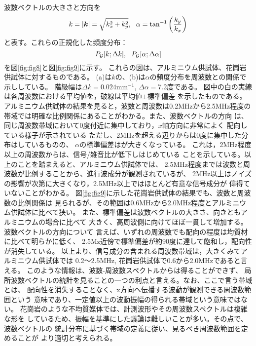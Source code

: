 波数ベクトルの大きさと方向を
\begin{equation}
	k=\left| \fat{k} \right|=\sqrt{k_x^2+k_y^2},  \ \ 
	\alpha = \tan^{-1} \left( \frac{k_y}{k_x} \right)
	\label{eqn:kpol}
\end{equation}
と表す。これらの正規化した頻度分布：
\[
	P_{\cal G}[k;\Delta k], \ \ 
	P_{\cal G}[\alpha;\Delta \alpha]
\]
を図\ref{fig:fig8}と図\ref{fig:fig9}に示す。
これらの図は、アルミニウム供試体、花崗岩供試体に対するものである。
(a)は$k$の、(b)は$\alpha$の頻度分布を周波数との関係で示ししている。
階級幅は$\Delta k=0.024$mm$^{-1}$, $\Delta \alpha=$7.2度である。
図中の白の実線は各周波数における平均値を，破線は平均値$\pm$標準偏差
を示したものである。
アルミニウム供試体の結果を見ると，波数と周波数は0.2MHzから2.5MHz程度の
帯域では明確な比例関係にあることがわかる。また、波数ベクトルの方向
は、同じ周波数帯域において0度付近に集中しており，$x$軸方向に非常によく
配向している様子が示されている
ただし、2MHzを超える辺りからは0度に集中した分布はしているものの、
$\alpha$の標準偏差はが大きくなっている。
これは，2MHz程度以上の周波数からは、信号/雑音比が低下しはじめている
ことを示している。以上のことを踏まえると、アルミニウム供試体では、
2.5MHz程度までは波数と周波数が比例することから、進行波成分が観測されているが、
2MHz以上はノイズの影響が次第に大きくなり，2.5MHz以上ではほとんど有意な信号成分が
偉得ていないことがわかる。
図\ref{fig:fig9}に示した花崗岩供試体の結果でも、波数と周波数の比例関係は
見られるが、その範囲は0.6MHzから2.0MHz程度とアルミニウム供試体に比べて狭い。
また、標準偏差は波数ベクトルの大きさ、向きともアルミニウムの場合に比べて
大きく、高周波側に向けてほぼ一貫して増加する。波数ベクトルの方向について
言えば、いずれの周波数でも配向の程度は均質材に比べて明らかに低く、
2.5Mz近傍で標準偏差が約90度に達して飽和し，配向性が消失している。
以上より、信号成分の含まれる周波数帯域は，大きくみてアルミニウム供試体では
0.2〜2.5MHz, 花崗岩供試体で0.6から2.0MHzであると言える。
このような情報は、波数-周波数スペクトルからは得ることができず、
局所波数ベクトルの統計を見ることの一つの利点と言える。なお、ここで言う帯域とは、
配向性を消失することなく、x方向へ伝播する波動が観測できる周波数範囲という
意味であり、一定値以上の波動振幅の得られる帯域という意味ではない。
花崗岩のような不均質媒体では、計測波形やその周波数スペクトルは複雑な形を
しているため、振幅を基準にした議論は難しいことが多い。その点で、波数ベクトルの
統計分布に基づく帯域の定義に従い、見るべき周波数範囲を定めることが
より適切と考えられる。
